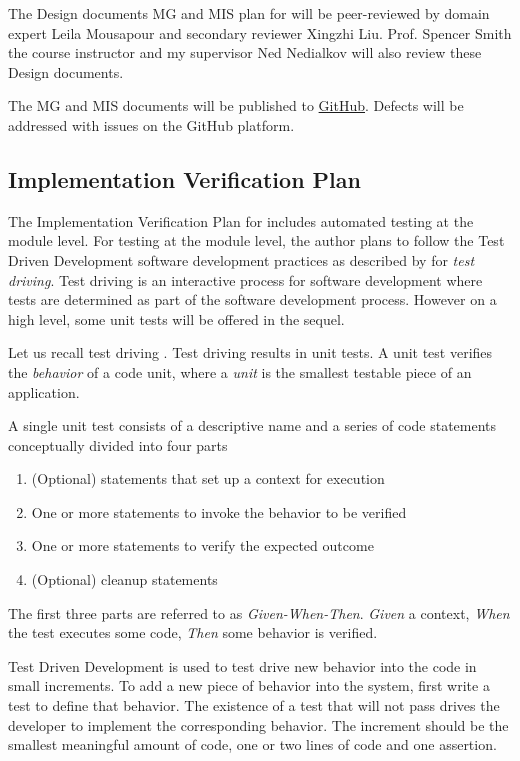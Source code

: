 \documentclass[12pt, titlepage]{article}
\begin{document}
The Design documents MG and MIS plan for  will be peer-reviewed by
domain expert Leila Mousapour and secondary reviewer Xingzhi Liu.
Prof. Spencer Smith the course instructor and my supervisor Ned Nedialkov will also review these Design
documents.

The MG and MIS documents will be published to \href{https://github.com/JohnErnsthausen/roc}{GitHub}.
Defects will be addressed with issues on the GitHub platform.

\subsection{Implementation Verification Plan}

The Implementation Verification Plan for  includes automated testing at the module level.
For testing at the module level, the author plans to follow the Test Driven Development
software development practices as described by \cite{langr2013} for {\it test driving}.
Test driving is an interactive process for software development where tests are determined
as part of the software development process. However on a high level, some unit tests
will be offered in the sequel.

Let us recall test driving \cite{langr2013}.
Test driving results in unit tests. A unit test verifies the {\it behavior} of a code unit,
where a {\it unit} is the smallest testable piece of an application.

A single unit test consists of a descriptive name and a series of code statements conceptually
divided into four parts

\begin{enumerate}
  \item (Optional) statements that set up a context for execution
  \item One or more statements to invoke the behavior to be verified
  \item One or more statements to verify the expected outcome
  \item (Optional) cleanup statements
\end{enumerate}

The first three parts are referred to as {\it Given-When-Then}. {\it Given} a context, {\it When}
the test executes some code, {\it Then} some behavior is verified.

Test Driven Development is used to test drive new behavior into the code in small increments. To
add a new piece of behavior into the system, first write a test to define that behavior. The
existence of a test that will not pass drives the developer to implement the corresponding behavior.
The increment should be the smallest meaningful amount of code, one or two lines of code and one assertion.
\end{document}
